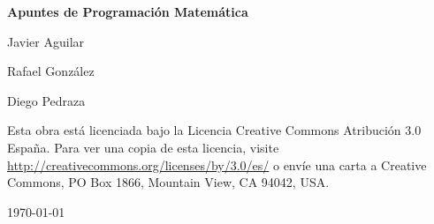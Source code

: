 \documentclass[twoside]{report}
\theoremstyle{definition}
\numberwithin{equation}{section}
\begin{document}
\begin{titlepage}
	\centering
	{\huge\bfseries Apuntes de Programación Matemática\par}
	\vspace{2cm}
	{\Large Javier Aguilar\par}
	{\Large Rafael González\par}
	{\Large Diego Pedraza\par}
	\vfill
	Esta obra está licenciada bajo la Licencia Creative Commons Atribución 3.0 España. Para ver una copia de esta licencia, visite \url{http://creativecommons.org/licenses/by/3.0/es/} o envíe una carta a Creative Commons, PO Box 1866, Mountain View, CA 94042, USA.

	{\large \today\par}
\end{titlepage}

\end{document}
